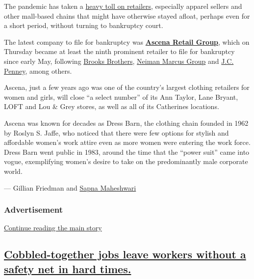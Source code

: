 The pandemic has taken a
\href{https://www.nytimes.com/2020/07/05/business/coronavirus-malls-department-stores-bankruptcy.html}{heavy
toll on retailers}, especially apparel sellers and other mall-based
chains that might have otherwise stayed afloat, perhaps even for a short
period, without turning to bankruptcy court.

The latest company to file for bankruptcy was
\textbf{\href{https://www.nytimes.com/2020/07/23/business/ascena-bankruptcy-ann-taylor-lane-bryant.html}{Ascena
Retail Group}}, which on Thursday became at least the ninth prominent
retailer to file for bankruptcy since early May, following
\href{https://www.nytimes.com/2020/07/08/business/brooks-brothers-chapter-11-bankruptcy.html}{Brooks
Brothers},
\href{https://www.nytimes.com/2020/05/07/business/neiman-marcus-bankruptcy.html}{Neiman
Marcus Group} and
\href{https://www.nytimes.com/2020/05/15/business/jc-penney-bankruptcy-coronavirus.html}{J.C.
Penney}, among others.

Ascena, just a few years ago was one of the country's largest clothing
retailers for women and girls, will close ``a select number'' of its Ann
Taylor, Lane Bryant, LOFT and Lou \& Grey stores, as well as all of its
Catherines locations.

Ascena was known for decades as Dress Barn, the clothing chain founded
in 1962 by Roslyn S. Jaffe, who noticed that there were few options for
stylish and affordable women's work attire even as more women were
entering the work force. Dress Barn went public in 1983, around the time
that the ``power suit'' came into vogue, exemplifying women's desire to
take on the predominantly male corporate world.

--- Gillian Friedman and
\href{https://www.nytimes.com/by/sapna-maheshwari}{Sapna Maheshwari}

\hypertarget{advertisement-2}{%
\subsubsection{Advertisement}\label{advertisement-2}}

\protect\hyperlink{after-dfp-ad-mid3}{Continue reading the main story}

\hypertarget{cobbled-together-jobs-leave-workers-without-a-safety-net-in-hard-times}{%
\subsection{\texorpdfstring{\protect\hyperlink{cobbled-together-jobs-leave-workers-without-a-safety-net-in-hard-times}{Cobbled-together
jobs leave workers without a safety net in hard
times.}}{Cobbled-together jobs leave workers without a safety net in hard times.}}\label{cobbled-together-jobs-leave-workers-without-a-safety-net-in-hard-times}}

